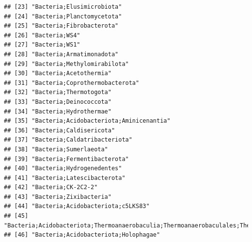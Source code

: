 \documentclass[
]{book}
\begin{document}
\begin{verbatim}
## [23] "Bacteria;Elusimicrobiota"                                                                             
## [24] "Bacteria;Planctomycetota"                                                                             
## [25] "Bacteria;Fibrobacterota"                                                                              
## [26] "Bacteria;WS4"                                                                                         
## [27] "Bacteria;WS1"                                                                                         
## [28] "Bacteria;Armatimonadota"                                                                              
## [29] "Bacteria;Methylomirabilota"                                                                           
## [30] "Bacteria;Acetothermia"                                                                                
## [31] "Bacteria;Coprothermobacterota"                                                                        
## [32] "Bacteria;Thermotogota"                                                                                
## [33] "Bacteria;Deinococcota"                                                                                
## [34] "Bacteria;Hydrothermae"                                                                                
## [35] "Bacteria;Acidobacteriota;Aminicenantia"                                                               
## [36] "Bacteria;Caldisericota"                                                                               
## [37] "Bacteria;Caldatribacteriota"                                                                          
## [38] "Bacteria;Sumerlaeota"                                                                                 
## [39] "Bacteria;Fermentibacterota"                                                                           
## [40] "Bacteria;Hydrogenedentes"                                                                             
## [41] "Bacteria;Latescibacterota"                                                                            
## [42] "Bacteria;CK-2C2-2"                                                                                    
## [43] "Bacteria;Zixibacteria"                                                                                
## [44] "Bacteria;Acidobacteriota;c5LKS83"                                                                     
## [45] "Bacteria;Acidobacteriota;Thermoanaerobaculia;Thermoanaerobaculales;Thermoanaerobaculaceae;Subgroup_10"
## [46] "Bacteria;Acidobacteriota;Holophagae"                                                                  

\end{verbatim}
\end{document}

